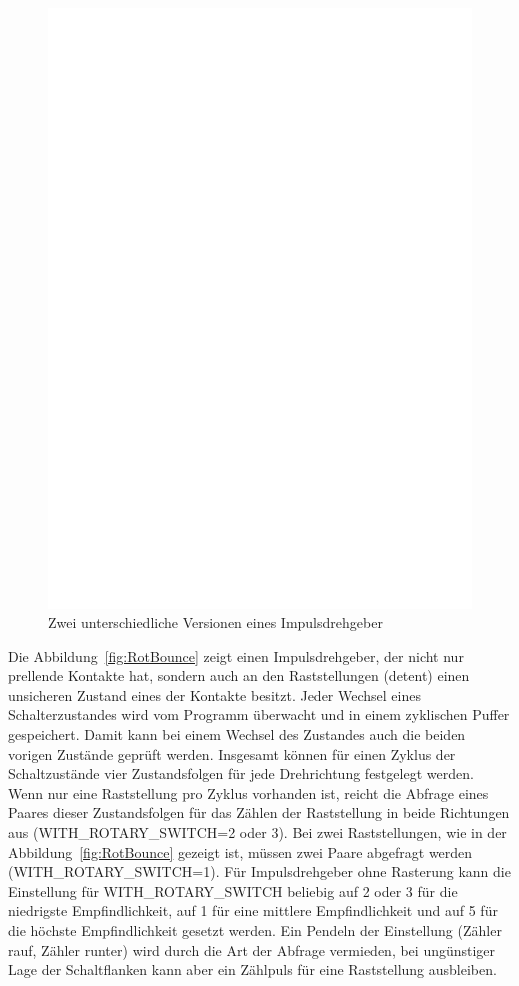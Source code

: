 \begin{figure}[H]
\centering
\includegraphics[width=14cm]{../FIG/rotary_encoder.eps}
\caption{Zwei unterschiedliche Versionen eines Impulsdrehgeber}
\label{fig:RotEnc}
\end{figure}

Die Abbildung~\ref{fig:RotBounce} zeigt einen Impulsdrehgeber, der nicht nur
prellende Kontakte hat, sondern auch an den Raststellungen (detent) einen unsicheren Zustand
eines der Kontakte besitzt. Jeder Wechsel eines Schalterzustandes wird vom Programm 
überwacht und in einem zyklischen Puffer gespeichert. Damit kann bei einem Wechsel des
Zustandes auch die beiden vorigen Zustände geprüft werden.
Insgesamt können für einen Zyklus der Schaltzustände vier Zustandsfolgen für jede Drehrichtung
festgelegt werden. Wenn nur eine Raststellung pro Zyklus vorhanden ist, reicht die Abfrage eines
Paares dieser Zustandsfolgen für das Zählen der Raststellung in beide Richtungen aus (WITH\_ROTARY\_SWITCH=2 oder 3).
Bei zwei Raststellungen, wie in der Abbildung~\ref{fig:RotBounce} gezeigt ist,
müssen zwei Paare abgefragt werden (WITH\_ROTARY\_SWITCH=1).
Für Impulsdrehgeber ohne Rasterung kann die Einstellung für WITH\_ROTARY\_SWITCH beliebig auf
2 oder 3 für die niedrigste Empfindlichkeit, auf 1 für eine mittlere Empfindlichkeit und auf 5 für
die höchste Empfindlichkeit gesetzt werden. 
Ein Pendeln der Einstellung (Zähler rauf, Zähler runter) wird durch die Art der Abfrage vermieden, bei
ungünstiger Lage der Schaltflanken kann aber ein Zählpuls für eine Raststellung ausbleiben.


